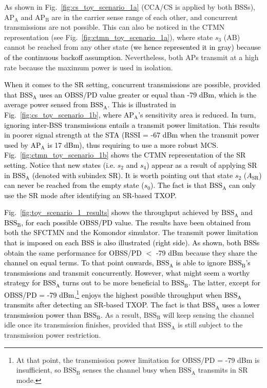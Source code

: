 \documentclass[preprint,12pt]{elsarticle}
\begin{document}
As shown in Fig.~\ref{fig:cs_toy_scenario_1a} (CCA/CS is applied by both BSSs), $\text{AP}_\text{A}$ and $\text{AP}_\text{B}$ are in the carrier sense range of each other, and concurrent transmissions are not possible. This can also be noticed in the CTMN representation (see Fig.~\ref{fig:ctmn_toy_scenario_1a}), where state $s_3$ (AB) cannot be reached from any other state \textcolor{black}{(we hence represented it in gray) because of the continuous backoff assumption}. Nevertheless, both APs transmit at a high rate because the maximum power is used in isolation. %

\textcolor{black}{When it comes to the SR setting, concurrent transmissions are possible, provided that $\text{BSS}_\text{A}$ uses an OBSS/PD value greater or equal than -79 dBm, which is the average power sensed from $\text{BSS}_\text{A}$. This is illustrated in Fig.~\ref{fig:cs_toy_scenario_1b}, where $\text{AP}_\text{A}$'s sensitivity area is reduced. In turn, ignoring inter-BSS transmissions entails a transmit power limitation. This results in poorer signal strength at the STA (RSSI = -67 dBm when the transmit power used by AP$_\text{A}$ is 17 dBm), thus requiring to use a more robust MCS. Fig.~\ref{fig:ctmn_toy_scenario_1b} shows the CTMN representation of the SR setting. Notice that new states (i.e. $s_2$ and $s_4$) appear as a result of applying SR in $\text{BSS}_\text{A}$ (denoted with subindex $\text{SR}$). It is worth pointing out that state $s_2$ ($A_\text{SR}$) can never be reached from the empty state ($s_0$). The fact is that $\text{BSS}_\text{A}$ can only use the SR mode after identifying an SR-based TXOP.}

\textcolor{black}{Fig.~\ref{fig:toy_scenario_1_results} shows the throughput achieved by $\text{BSS}_\text{A}$ and $\text{BSS}_\text{B}$, for each possible OBSS/PD value. The results have been obtained from both the SFCTMN and the Komondor simulator. The transmit power limitation that is imposed on each BSS is also illustrated (right side). As shown, both BSSs obtain the same performance for OBSS/PD $<$ -79 dBm because they share the channel on equal terms. To that point onwards, $\text{BSS}_\text{A}$ is able to ignore $\text{BSS}_\text{B}$'s transmissions and transmit concurrently. However, what might seem a worthy strategy for $\text{BSS}_\text{A}$ turns out to be more beneficial to $\text{BSS}_\text{B}$. The latter, except for OBSS/PD = -79 dBm,\footnote{At that point, the transmission power limitation for OBSS/PD = -79 dBm is insufficient, so $\text{BSS}_\text{B}$ senses the channel busy when $\text{BSS}_\text{A}$ transmits in SR mode.} enjoys the highest possible throughput when $\text{BSS}_\text{A}$ transmits after detecting an SR-based TXOP. The fact is that $\text{BSS}_\text{A}$ uses a lower transmission power than $\text{BSS}_\text{B}$.} As a result, $\text{BSS}_\text{B}$ will keep sensing the channel idle once its transmission finishes, provided that $\text{BSS}_\text{A}$ is still subject to the transmission power restriction.
\end{document}
